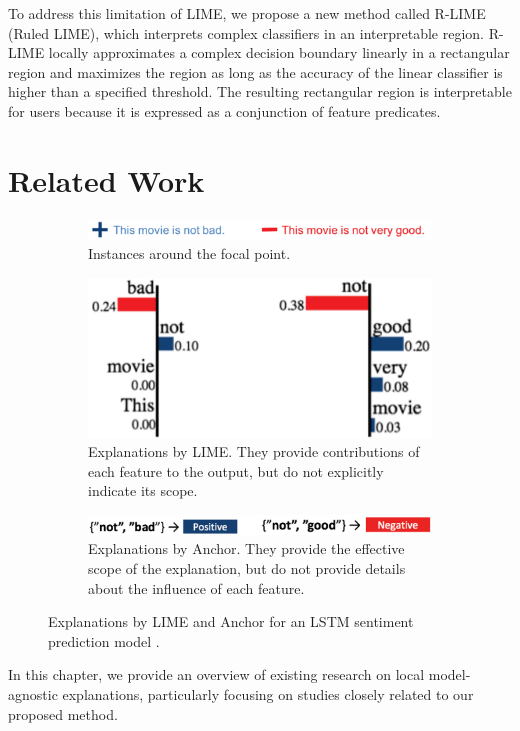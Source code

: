 \documentclass[runningheads]{llncs}
\begin{document}
To address this limitation of LIME,
we propose a new method called R-LIME (Ruled LIME),
which interprets complex classifiers in an interpretable region.
R-LIME locally approximates a complex decision boundary linearly
in a rectangular region and maximizes the region as long as the accuracy of the linear
classifier is higher than a specified threshold.
The resulting rectangular region is interpretable for users because it is
expressed as a conjunction of feature predicates.

\section{Related Work}
\begin{figure}[t]
	\centering
	\vspace{0.5cm}
	\begin{subfigure}[t]{0.55\textwidth}
		\centering
		\includegraphics[width=\textwidth]{lime_vs_anchor_exp_a.png}
		\caption{Instances around the focal point.}\label{fig:lime_vs_anchor_exp_a}
		\vspace{0.5cm}
	\end{subfigure}
	\begin{subfigure}[t]{0.45\textwidth}
		\centering
		\includegraphics[width=\textwidth]{lime_vs_anchor_exp_b.png}
		\caption{%
			Explanations by LIME\@.
			They provide contributions of each feature to the output,
			but do not explicitly indicate its scope.
		}\label{fig:lime_vs_anchor_exp_b}
		\vspace{0.5cm}
	\end{subfigure}
	\begin{subfigure}[t]{0.55\textwidth}
		\centering
		\includegraphics[width=\textwidth]{lime_vs_anchor_exp_c.png}
		\caption{%
			Explanations by Anchor.
			They provide the effective scope of the explanation,
			but do not provide details about the influence of each feature.
		}\label{fig:lime_vs_anchor_exp_c}
	\end{subfigure}
	\caption{%
		Explanations by LIME and Anchor
		for an LSTM sentiment prediction model \cite{ribeiro2018anchors}.
	}\label{fig:lime_vs_anchor_exp}
\end{figure}
In this chapter,
we provide an overview of existing research on local model-agnostic explanations,
particularly focusing on studies closely related to our proposed method.
\end{document}
